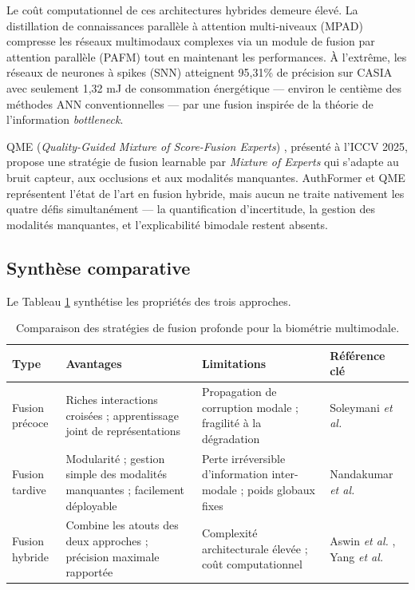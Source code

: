 \documentclass[12pt,a4paper]{report}
\begin{document}
Le co\^{u}t computationnel de ces architectures hybrides demeure \'{e}lev\'{e}. La distillation de connaissances parall\`{e}le \`{a} attention multi-niveaux (MPAD) \cite{lu2025mpad} compresse les r\'{e}seaux multimodaux complexes via un module de fusion par attention parall\`{e}le (PAFM) tout en maintenant les performances. \`{A} l'extr\^{e}me, les r\'{e}seaux de neurones \`{a} spikes (SNN) \cite{shen2025energy} atteignent 95,31\% de pr\'{e}cision sur CASIA avec seulement 1,32 mJ de consommation \'{e}nerg\'{e}tique --- environ le centi\`{e}me des m\'{e}thodes ANN conventionnelles --- par une fusion inspir\'{e}e de la th\'{e}orie de l'information \textit{bottleneck}.

QME (\textit{Quality-Guided Mixture of Score-Fusion Experts}) \cite{zhu2025qme}, pr\'{e}sent\'{e} \`{a} l'ICCV 2025, propose une strat\'{e}gie de fusion learnable par \textit{Mixture of Experts} qui s'adapte au bruit capteur, aux occlusions et aux modalit\'{e}s manquantes. AuthFormer et QME repr\'{e}sentent l'\'{e}tat de l'art en fusion hybride, mais aucun ne traite nativement les quatre d\'{e}fis simultan\'{e}ment --- la quantification d'incertitude, la gestion des modalit\'{e}s manquantes, et l'explicabilit\'{e} bimodale restent absents.

\subsection{Synth\`{e}se comparative}

Le Tableau \ref{tab:comparais_fusion} synth\'{e}tise les propri\'{e}t\'{e}s des trois approches.

\begin{table}[htbp]
\centering
\caption{Comparaison des strat\'{e}gies de fusion profonde pour la biom\'{e}trie multimodale.}
\label{tab:comparais_fusion}
\small
\begin{tabular}{>{\raggedright}p{2.8cm}>{\raggedright}p{4.2cm}>{\raggedright}p{4.5cm}>{\raggedright\arraybackslash}p{3.5cm}}
\hline
\textbf{Type} & \textbf{Avantages} & \textbf{Limitations} & \textbf{R\'{e}f\'{e}rence cl\'{e}} \\
\hline
\hline
Fusion pr\'{e}coce & Riches interactions crois\'{e}es ; apprentissage joint de repr\'{e}sentations & Propagation de corruption modale ; fragilit\'{e} \`{a} la d\'{e}gradation & Soleymani \textit{et al.} \cite{soleymani2018generalized} \\
\hline
Fusion tardive & Modularit\'{e} ; gestion simple des modalit\'{e}s manquantes ; facilement d\'{e}ployable & Perte irr\'{e}versible d'information inter-modale ; poids globaux fixes & Nandakumar \textit{et al.} \cite{nandakumar2008likelihood} \\
\hline
Fusion hybride & Combine les atouts des deux approches ; pr\'{e}cision maximale rapport\'{e}e & Complexit\'{e} architecturale \'{e}lev\'{e}e ; co\^{u}t computationnel & Aswin \textit{et al.} \cite{aswin2025deep}, Yang \textit{et al.} \cite{yang2024authformer} \\
\hline
\end{tabular}
\end{table}
\end{document}
